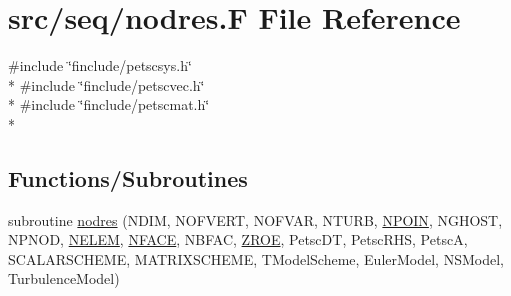 \hypertarget{seq_2nodres_8_f}{\section{src/seq/nodres.F File Reference}
\label{seq_2nodres_8_f}
}
{\ttfamily \#include \char`\"{}finclude/petscsys.\-h\char`\"{}}\\*
{\ttfamily \#include \char`\"{}finclude/petscvec.\-h\char`\"{}}\\*
{\ttfamily \#include \char`\"{}finclude/petscmat.\-h\char`\"{}}\\*
\subsection*{Functions/\-Subroutines}
\begin{DoxyCompactItemize}
\item 
subroutine \hyperlink{seq_2nodres_8_f_afe82d6b12790dae1c4e9686db54b5f82}{nodres} (N\-D\-I\-M, N\-O\-F\-V\-E\-R\-T, N\-O\-F\-V\-A\-R, N\-T\-U\-R\-B, \hyperlink{mesh_8com_ae28c1572321efcd8715b974d87d20c58}{N\-P\-O\-I\-N}, N\-G\-H\-O\-S\-T, N\-P\-N\-O\-D, \hyperlink{mesh_8com_aee5e75b79d0e815c0603cfbccc618957}{N\-E\-L\-E\-M}, \hyperlink{mesh_8com_a78142d59d4cbb9fedbede16187658dd3}{N\-F\-A\-C\-E}, N\-B\-F\-A\-C, \hyperlink{myts_8com_a0c4fbcdb78e6b50c8919d714e4b5a694}{Z\-R\-O\-E}, Petsc\-D\-T, Petsc\-R\-H\-S, Petsc\-A, S\-C\-A\-L\-A\-R\-S\-C\-H\-E\-M\-E, M\-A\-T\-R\-I\-X\-S\-C\-H\-E\-M\-E, T\-Model\-Scheme, Euler\-Model, N\-S\-Model, Turbulence\-Model)
\end{DoxyCompactItemize}


